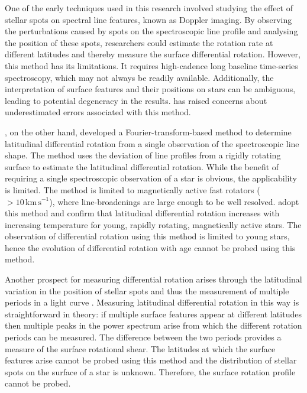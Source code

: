 One of the early techniques used in this research involved studying the effect of stellar spots on spectral line features, known as Doppler imaging. 
By observing the perturbations caused by spots on the spectroscopic line profile and analysing the position of these spots, researchers could estimate the rotation rate at different latitudes and thereby measure the surface differential rotation. However, this method has its limitations. It requires high-cadence long baseline time-series spectroscopy, which may not always be readily available. Additionally, the interpretation of surface features and their positions on stars can be ambiguous, leading to potential degeneracy in the results. 
\citet{collier_differential_2007} has raised concerns about underestimated errors associated with this method.

\citet{reiners_rotation_2002}, on the other hand, developed a Fourier-transform-based method to determine latitudinal differential rotation from a single observation of the spectroscopic line shape.
The method uses the deviation of line profiles from a rigidly rotating surface to estimate the latitudinal differential rotation.
While the benefit of requiring a single spectroscopic observation of a star is obvious, the applicability is limited.
The method is limited to magnetically active fast rotators (\vsini\ $> 10\,\mathrm{km\,s}^{-1}$), where line-broadenings are large enough to be well resolved.
\citet{barnes_dependence_2005, reiners_rotation_2002} adopt this method and confirm that latitudinal differential rotation increases with increasing temperature for young, rapidly rotating, magnetically active stars.
The observation of differential rotation using this method is limited to young stars, hence the evolution of differential rotation with age cannot be probed using this method.

Another prospect for measuring differential rotation arises through the latitudinal variation in the position of stellar spots and thus the measurement of multiple periods in a light curve \citep[see, e.g.,][]{walcowicz_rotation_2013, reinhold_rotation_2013}.
Measuring latitudinal differential rotation in this way is straightforward in theory: if multiple surface features appear at different latitudes then multiple peaks in the power spectrum arise from which the different rotation periods can be measured.
The difference between the two periods provides a measure of the surface rotational shear.
The latitudes at which the surface features arise cannot be probed using this method and the distribution of stellar spots on the surface of a star is unknown.
Therefore, the surface rotation profile cannot be probed.

